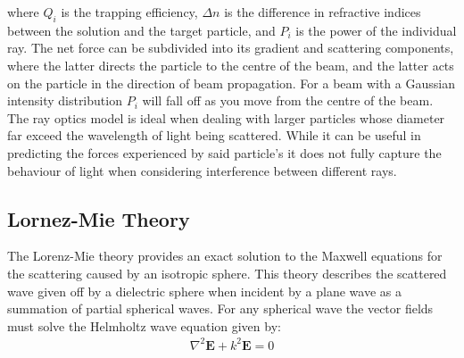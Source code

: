 where $Q_i$ is the trapping efficiency, $\Delta n$ is the difference
in refractive indices between the solution and the target particle,
and $P_i$ is the power of the individual ray. The net force can be 
subdivided into its gradient and scattering components, where the latter
directs the particle to the centre of the beam, and the latter acts on 
the particle in the direction of beam propagation. For a beam with a
Gaussian intensity distribution $P_i$ will fall off as you move from
the centre of the beam. The ray optics model is ideal when dealing 
with larger particles whose diameter far exceed the wavelength of light
being scattered. While it can be useful in predicting the forces 
experienced by said particle's it does not fully capture the behaviour
of light when considering interference between different rays.


\subsection{Lornez-Mie Theory}

The Lorenz-Mie theory provides an exact solution to the Maxwell equations 
for the scattering caused by an isotropic sphere. This theory describes the 
scattered wave given off by a dielectric sphere when incident by a plane 
wave as a summation of partial spherical waves. For any spherical wave the 
vector fields must solve the Helmholtz wave equation given by:
\begin{align}
	\nabla^2\mathbf{E} +k^2\mathbf{E} = 0
\end{align} 

